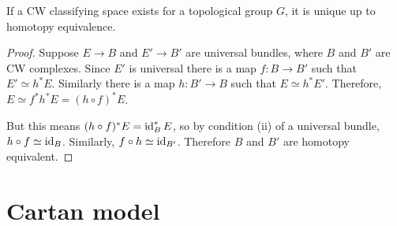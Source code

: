 \begin{comment}
Let $X$ be a CW complex, and $[X,B]$ be the homotopy classes of maps $h:X\to B$, 
and  $\mathcal{P}_G(X)$ be the isomorphism classes of principal $G$-bundles over $X$. 
Then the definition of universal $G$-bundle states the map
$\varphi:[X,BG]\to\mathcal{P}_G(X)$ given by $h\mapsto h^*(EG)$ is surjective
(condition (i)) and injective (condition (ii)). 
\end{comment}

\begin{thm} %
	If a CW classifying space exists for a topological group $G$, it is unique 
	up to homotopy equivalence.
\end{thm}
\begin{proof}
	Suppose $E\to B$ and  $E'\to B'$ are universal bundles, where $B$ and  $B'$
	are CW complexes. Since  $E'$ is
	universal there is a map  $f:B\to B'$ such that  $E'\simeq h^*E$. Similarly
	there is a map  $h:B'\to B$ such that  $E\simeq h^*E'$. Therefore,  $E\simeq
	f^*h^*E=(h\circ f)^*E$. 

	But this means  $(h\circ f)^*E = \operatorname{id}_B^*E$, so by condition (ii) of a
	universal bundle, $h\circ f \simeq \operatorname{id}_B$. Similarly, $f\circ h\simeq
	\operatorname{id}_{B'}$. Therefore $B$ and  $B'$ are homotopy equivalent.
\end{proof}



\section{Cartan model}
